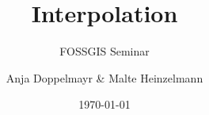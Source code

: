 \documentclass[a4paper,listof=totoc,toc=sectionentrywithdots]{scrartcl}
\title{Interpolation}
\subtitle{FOSSGIS Seminar}
\date{\today}
\author{Anja Doppelmayr \& Malte Heinzelmann}
\affil{Ruprecht-Karls-Universit\"at Heidelberg}
\begin{document}
\maketitle

\begin{abstract}
	
\end{abstract}
\pagebreak

\tableofcontents
\pagebreak



\end{document}
